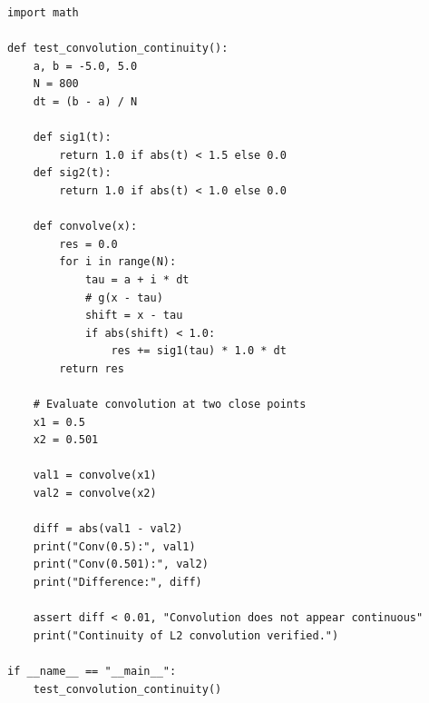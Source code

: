 \documentclass[11pt,a4paper]{article}
\begin{document}
\begin{lstlisting}
import math

def test_convolution_continuity():
    a, b = -5.0, 5.0
    N = 800
    dt = (b - a) / N

    def sig1(t):
        return 1.0 if abs(t) < 1.5 else 0.0
    def sig2(t):
        return 1.0 if abs(t) < 1.0 else 0.0

    def convolve(x):
        res = 0.0
        for i in range(N):
            tau = a + i * dt
            # g(x - tau)
            shift = x - tau
            if abs(shift) < 1.0:
                res += sig1(tau) * 1.0 * dt
        return res

    # Evaluate convolution at two close points
    x1 = 0.5
    x2 = 0.501

    val1 = convolve(x1)
    val2 = convolve(x2)

    diff = abs(val1 - val2)
    print("Conv(0.5):", val1)
    print("Conv(0.501):", val2)
    print("Difference:", diff)

    assert diff < 0.01, "Convolution does not appear continuous"
    print("Continuity of L2 convolution verified.")

if __name__ == "__main__":
    test_convolution_continuity()
\end{lstlisting}
\end{document}
